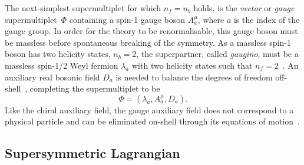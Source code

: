 The next-simplest supermultiplet for which $n_f = n_b$ holds, is the \textit{vector} or \textit{gauge} supermultiplet~$\Phi$ containing a spin-1 gauge boson $A^\mu_a$, where $a$ is the index of the gauge group. In order for the theory to be renormalisable, this gauge boson must be massless before spontaneous breaking of the symmetry.
As a massless spin-1 boson has two helicity states, \ie $n_b = 2$, the superpartner, called \textit{gaugino}, must be a massless spin-1/2 Weyl fermion $\lambda_a$ with two helicity states such that $n_f = 2$~\cite{Martin:1997ns}. An auxiliary real bosonic field $D_a$ is needed to balance the degrees of freedom off-shell~\cite{Bustamante:2009us}, completing the supermultiplet to be
\begin{equation}
	\Phi = (\lambda_a,A^\mu_a,D_a).
\end{equation}
 Like the chiral auxiliary field, the gauge auxiliary field does not correspond to a physical particle and can be eliminated on-shell through its equations of motion~\cite{Martin:1997ns}.
 
\subsection{Supersymmetric Lagrangian}\label{sec:susy_lagrangian}

